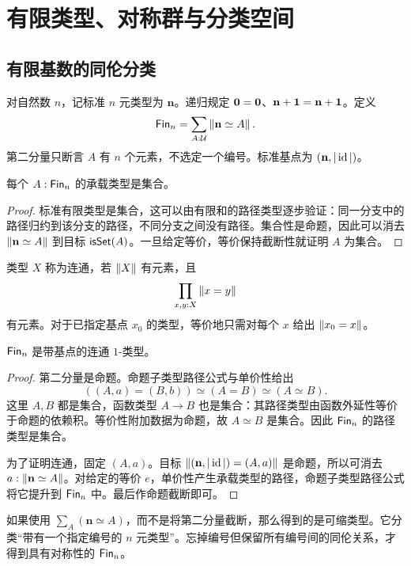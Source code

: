 \chapter{有限类型、对称群与分类空间}
\section{有限基数的同伦分类}
\begin{definition}[有限类型]
对自然数 $n$，记标准 $n$ 元类型为 $\mathbf n$。递归规定 $\mathbf0=\mathbf 0$、$\mathbf{n+1}=\mathbf n+\mathbf 1$。定义
\[
\mathsf{Fin}_n=\sum_{A:\mathcal U}\left\|\mathbf n\simeq A\right\|.
\]
第二分量只断言 $A$ 有 $n$ 个元素，不选定一个编号。标准基点为 $(\mathbf n,|\operatorname{id}|)$。
\end{definition}
\begin{lemma}
每个 $A:\mathsf{Fin}_n$ 的承载类型是集合。
\end{lemma}
\begin{proof}
标准有限类型是集合，这可以由有限和的路径类型逐步验证：同一分支中的路径归约到该分支的路径，不同分支之间没有路径。集合性是命题，因此可以消去 $\left\|\mathbf n\simeq A\right\|$ 到目标 $\mathsf{isSet}(A)$。一旦给定等价，等价保持截断性就证明 $A$ 为集合。
\end{proof}
\begin{definition}[连通类型]
类型 $X$ 称为连通，若 $\left\|X\right\|$ 有元素，且
\[
\prod_{x,y:X}\left\|x=y\right\|
\]
有元素。对于已指定基点 $x_0$ 的类型，等价地只需对每个 $x$ 给出 $\left\|x_0=x\right\|$。
\end{definition}
\begin{proposition}
$\mathsf{Fin}_n$ 是带基点的连通 $1$-类型。
\end{proposition}
\begin{proof}
第二分量是命题。命题子类型路径公式与单价性给出
\[
((A,a)=(B,b))\simeq(A=B)\simeq(A\simeq B).
\]
这里 $A,B$ 都是集合，函数类型 $A\to B$ 也是集合：其路径类型由函数外延性等价于命题的依赖积。等价性附加数据为命题，故 $A\simeq B$ 是集合。因此 $\mathsf{Fin}_n$ 的路径类型是集合。

为了证明连通，固定 $(A,a)$。目标 $\left\|(\mathbf n,|\operatorname{id}|)=(A,a)\right\|$ 是命题，所以可消去 $a:\left\|\mathbf n\simeq A\right\|$。对给定的等价 $e$，单价性产生承载类型的路径，命题子类型路径公式将它提升到 $\mathsf{Fin}_n$ 中。最后作命题截断即可。
\end{proof}
\begin{remark}
如果使用 $\sum_A(\mathbf n\simeq A)$，而不是将第二分量截断，那么得到的是可缩类型。它分类“带有一个指定编号的 $n$ 元类型”。忘掉编号但保留所有编号间的同伦关系，才得到具有对称性的 $\mathsf{Fin}_n$。
\end{remark}

